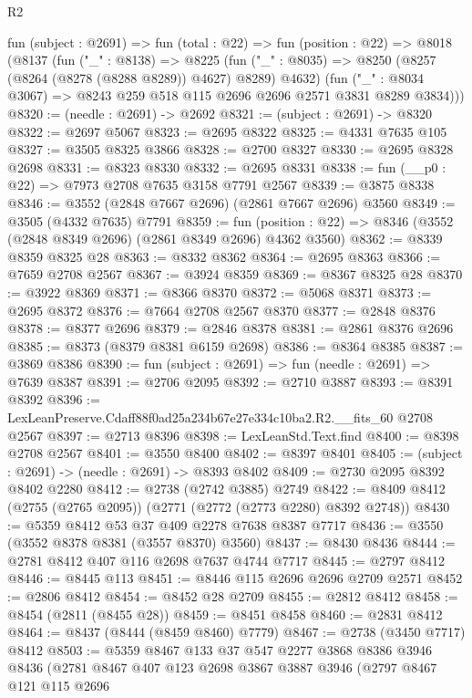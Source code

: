 \begin{lexlean}{R2}
\begin{coremodule}
  fun (subject : @2691) =>
  fun (total : @22) =>
  fun (position : @22) =>
  @8018
    (@8137
      (fun ("_" : @8138) =>
      @8225
        (fun ("_" : @8035) => @8250 (@8257 (@8264 (@8278 (@8288 @8289)) @4627) @8289) @4632)
        (fun ("_" : @8034 @3067) => @8243 @259 @518 @115 @2696 @2696 @2571 @3831 @8289 @3834)))
@8320 := (needle : @2691) -> @2692
@8321 := (subject : @2691) -> @8320
@8322 := @2697 @5067
@8323 := @2695 @8322
@8325 := @4331 @7635 @105
@8327 := @3505 @8325 @3866
@8328 := @2700 @8327
@8330 := @2695 @8328 @2698
@8331 := @8323 @8330
@8332 := @2695 @8331
@8338 := fun (__p0 : @22) => @7973 @2708 @7635 @3158 @7791 @2567
@8339 := @3875 @8338
@8346 := @3552 (@2848 @7667 @2696) (@2861 @7667 @2696) @3560
@8349 := @3505 (@4332 @7635) @7791
@8359 := fun (position : @22) => @8346 (@3552 (@2848 @8349 @2696) (@2861 @8349 @2696) @4362 @3560)
@8362 := @8339 @8359 @8325 @28
@8363 := @8332 @8362
@8364 := @2695 @8363
@8366 := @7659 @2708 @2567
@8367 := @3924 @8359
@8369 := @8367 @8325 @28
@8370 := @3922 @8369
@8371 := @8366 @8370
@8372 := @5068 @8371
@8373 := @2695 @8372
@8376 := @7664 @2708 @2567 @8370
@8377 := @2848 @8376
@8378 := @8377 @2696
@8379 := @2846 @8378
@8381 := @2861 @8376 @2696
@8385 := @8373 (@8379 @8381 @6159 @2698)
@8386 := @8364 @8385
@8387 := @3869 @8386
@8390 := fun (subject : @2691) => fun (needle : @2691) => @7639 @8387
@8391 := @2706 @2095
@8392 := @2710 @3887
@8393 := @8391 @8392
@8396 := LexLeanPreserve.Cdaff88f0ad25a234b67e27e334c10ba2.R2.__fits_60 @2708 @2567
@8397 := @2713 @8396
@8398 := LexLeanStd.Text.find
@8400 := @8398 @2708 @2567
@8401 := @3550 @8400
@8402 := @8397 @8401
@8405 := (subject : @2691) -> (needle : @2691) -> @8393 @8402
@8409 := @2730 @2095 @8392 @8402 @2280
@8412 := @2738 (@2742 @3885) @2749
@8422 := @8409 @8412 (@2755 (@2765 @2095)) (@2771 (@2772 (@2773 @2280) @8392 @2748))
@8430 := @5359 @8412 @53 @37 @409 @2278 @7638 @8387 @7717
@8436 := @3550 (@3552 @8378 @8381 (@3557 @8370) @3560)
@8437 := @8430 @8436
@8444 := @2781 @8412 @407 @116 @2698 @7637 @4744 @7717
@8445 := @2797 @8412
@8446 := @8445 @113
@8451 := @8446 @115 @2696 @2696 @2709 @2571
@8452 := @2806 @8412
@8454 := @8452 @28 @2709
@8455 := @2812 @8412
@8458 := @8454 (@2811 (@8455 @28))
@8459 := @8451 @8458
@8460 := @2831 @8412
@8464 := @8437 (@8444 (@8459 @8460) @7779)
@8467 := @2738 (@3450 @7717) @8412
@8503 := @5359
    @8467
    @133
    @37
    @547
    @2277
    @3868
    @8386
    @3946
    @8436
    (@2781
      @8467
      @407
      @123
      @2698
      @3867
      @3887
      @3946
      (@2797
        @8467
        @121
        @115
        @2696

\end{coremodule}
\end{lexlean}

